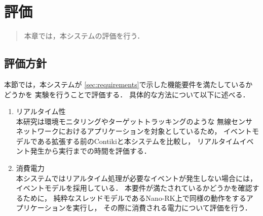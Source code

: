 \chapter{評価}
\begin{large}
\begin{quote}
本章では，本システムの評価を行う．
\end{quote}
\end{large}
\clearpage

\section{評価方針}
本節では，本システムが
\ref{sec:requirements}で示した機能要件を満たしているかどうかを
実験を行うことで評価する．
具体的な方法について以下に述べる．


\begin{enumerate}
\item{リアルタイム性}\\
本研究は環境モニタリングやターゲットトラッキングのような
無線センサネットワークにおけるアプリケーションを対象としているため，
イベントモデルである拡張する前のContikiと本システムを比較し，
リアルタイムイベント発生から実行までの時間を評価する．
\newline
\item{消費電力}\\
本システムではリアルタイム処理が必要なイベントが発生しない場合には，
イベントモデルを採用している．
本要件が満たされているかどうかを確認するために，
純粋なスレッドモデルであるNano-RK上で同様の動作をするアプリケーションを実行し，
その際に消費される電力について評価を行う．
\end{enumerate}




%



